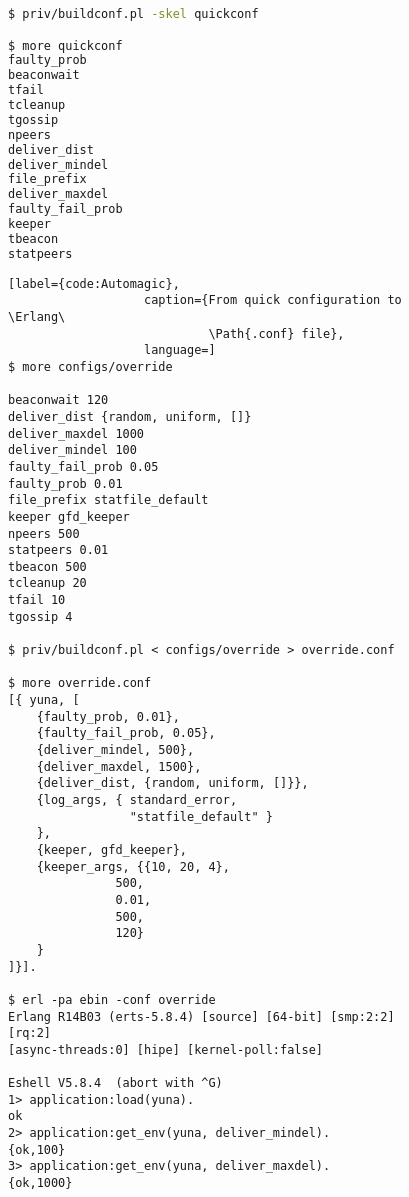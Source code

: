 \begin{figure}[tb!]
\begin{lstlisting}[label={code:Skeleton},
                   caption={Generating a quick configuration skeleton},
                   language=bash]
$ priv/buildconf.pl -skel quickconf

$ more quickconf
faulty_prob 
beaconwait 
tfail 
tcleanup 
tgossip 
npeers 
deliver_dist 
deliver_mindel 
file_prefix 
deliver_maxdel 
faulty_fail_prob 
keeper 
tbeacon 
statpeers 

\end{lstlisting}
\end{figure}

\begin{figure}[tb!]
\begin{lstlisting}[label={code:Automagic},
                   caption={From quick configuration to \Erlang\
                            \Path{.conf} file},
                   language=]
$ more configs/override

beaconwait 120
deliver_dist {random, uniform, []}
deliver_maxdel 1000
deliver_mindel 100
faulty_fail_prob 0.05
faulty_prob 0.01
file_prefix statfile_default
keeper gfd_keeper
npeers 500
statpeers 0.01
tbeacon 500
tcleanup 20
tfail 10
tgossip 4

$ priv/buildconf.pl < configs/override > override.conf

$ more override.conf
[{ yuna, [
	{faulty_prob, 0.01},
	{faulty_fail_prob, 0.05},
    {deliver_mindel, 500},
	{deliver_maxdel, 1500},
	{deliver_dist, {random, uniform, []}},
	{log_args, { standard_error,
	             "statfile_default" }
	},
	{keeper, gfd_keeper},
	{keeper_args, {{10, 20, 4},
		       500,
		       0.01,
		       500,
		       120}
	}
]}].

$ erl -pa ebin -conf override
Erlang R14B03 (erts-5.8.4) [source] [64-bit] [smp:2:2] [rq:2]
[async-threads:0] [hipe] [kernel-poll:false]

Eshell V5.8.4  (abort with ^G)
1> application:load(yuna).
ok
2> application:get_env(yuna, deliver_mindel).
{ok,100}
3> application:get_env(yuna, deliver_maxdel).
{ok,1000}
\end{lstlisting}
\end{figure}


